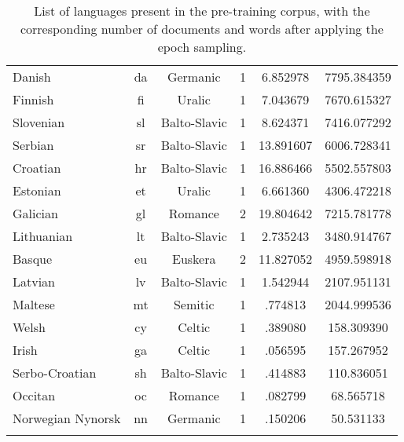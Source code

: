 \begin{table}[h!]
{\begin{tabular}{lccccS[round-mode=places, round-precision=6]}
Danish & da & Germanic & 1 & \num{6,852978} & \num{7795,384359} \\
Finnish & fi & Uralic & 1 & \num{7,043679} & \num{7670,615327} \\
Slovenian & sl & Balto-Slavic & 1 & \num{8,624371} & \num{7416,077292} \\
Serbian & sr & Balto-Slavic & 1 & \num{13,891607} & \num{6006,728341} \\
Croatian & hr & Balto-Slavic & 1 & \num{16,886466} & \num{5502,557803} \\
Estonian & et & Uralic & 1 & \num{6,661360} & \num{4306,472218} \\
Galician & gl & Romance & 2 & \num{19,804642} & \num{7215,781778} \\
Lithuanian & lt & Balto-Slavic & 1 & \num{2,735243} & \num{3480,914767} \\
Basque & eu & Euskera & 2 & \num{11,827052} & \num{4959,598918} \\
Latvian & lv & Balto-Slavic & 1 & \num{1,542944} & \num{2107,951131} \\
Maltese & mt & Semitic & 1 & \num{,774813} & \num{2044,999536} \\
Welsh & cy & Celtic & 1 & \num{,389080} & \num{158,309390} \\
Irish & ga & Celtic & 1 & \num{,056595} & \num{157,267952} \\
Serbo-Croatian & sh & Balto-Slavic & 1 & \num{,414883} & \num{110,836051} \\
Occitan & oc & Romance & 1 & \num{,082799} & \num{68,565718} \\
Norwegian Nynorsk & nn & Germanic & 1 & \num{,150206} & \num{50,531133} \\
\bottomrule \\
\end{tabular}
}
\caption{List of languages present in the pre-training corpus, with the corresponding number of documents and words after applying the epoch sampling.}
\label{tab:langs-corpus}
\end{table}